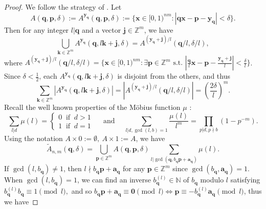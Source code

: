 \documentclass[reqno]{amsart}
\theoremstyle{definition}
\theoremstyle{remark}
\begin{document}
\begin{proof}
    We follow the strategy of \cite[Lemmas 6 and 7]{BV09}. Let 
    $$A(\mathbf{q}, \mathbf{p}, \delta) := A^{\mathbf{y}_\mathbf{q}} (\mathbf{q}, \mathbf{p}, \delta) := \{\mathbf{x} \in [0,1)^{nm} : |\mathbf{qx} - \mathbf{p} - \mathbf{y}_\mathbf{q}| < \delta \}.$$
    Then for any integer $l | \mathbf{q}$ and a vector $\mathbf{j} \in \mathbb{Z}^m$, we have
    $$\bigcup_{\mathbf{k} \in \mathbb{Z}^m} A^{\mathbf{y}_\mathbf{q}} (\mathbf{q}, l\mathbf{k} + \mathbf{j}, \delta) = A^{(\mathbf{y}_\mathbf{q} + \mathbf{j})/l}(\mathbf{q}/l, \delta/l),$$
    where $A^{(\mathbf{y}_\mathbf{q} + \mathbf{j})/l}(\mathbf{q}/l, \delta/l)= \{ \mathbf{x} \in [0,1)^{nm} : \exists \mathbf{p} \in \mathbb{Z}^m \text{ s.t. } |\frac{\mathbf{q}}{l}\mathbf{x} - \mathbf{p} - \frac{\mathbf{y}_\mathbf{q} + \mathbf{j}}{l}| <\frac{\delta}{l}\}$. Since $\delta<\frac{1}{2}$, each $A^{\mathbf{y}_\mathbf{q}} (\mathbf{q}, l\mathbf{k} + \mathbf{j}, \delta)$ is disjoint from the others, and thus
    $$\sum_{\mathbf{k} \in \mathbb{Z}^m} |A^{\mathbf{y}_\mathbf{q}} (\mathbf{q}, l\mathbf{k} + \mathbf{j}, \delta)| = \left|A^{(\mathbf{y}_\mathbf{q} + \mathbf{j})/l}(\mathbf{q}/l, \delta/l)\right| = \left(\frac{2\delta}{l}\right)^m.$$
    Recall the well known properties of the M\"obius function $\mu$ :
    \begin{equation}\label{mobius}
        \sum_{l|d} \mu(l)= \begin{cases} 0 \ \text{ if } \ d>1 \\ 1 \ \text{ if } \ d=1 \end{cases} \quad \text{ and } \quad \sum_{l|d, \gcd(l,b)=1} \frac{\mu(l)}{l^m} = \prod_{p|d, p\nmid b} (1-p^{-m}).
    \end{equation}
    Using the notation $A\times 0 := \emptyset,\ A\times 1 := A$, we have
    $$\tilde{A}_{n,m}(\mathbf{q},\delta) = \bigcup_{\mathbf{p} \in \mathbb{Z}^m} A(\mathbf{q}, \mathbf{p}, \delta) \sum_{l|\gcd(\mathbf{q}, b_\mathbf{q}\mathbf{p} + \mathbf{a}_\mathbf{q})} \mu(l).$$
    If $\gcd(l,b_\mathbf{q}) \neq 1$, then $l\nmid b_\mathbf{q}\mathbf{p} + \mathbf{a}_\mathbf{q}$ for any $\mathbf{p} \in \mathbb{Z}^m$ since $\gcd(b_\mathbf{q}, \mathbf{a}_\mathbf{q}) = 1$. When $\gcd(l, b_\mathbf{q})= 1$, we can find an inverse $b_\mathbf{q}^{(l)} \in \mathbb{N}$ of $b_\mathbf{q}$ modulo $l$ satisfying $b_\mathbf{q}^{(l)} b_\mathbf{q} \equiv 1 \pmod{l},$ and so $b_\mathbf{q} \mathbf{p} + \mathbf{a}_\mathbf{q} \equiv \mathbf{0} \pmod{l} \Leftrightarrow \mathbf{p} \equiv -b^{(l)}_\mathbf{q} \mathbf{a}_\mathbf{q} \pmod{l}$, thus we have

\end{proof}
\end{document}
